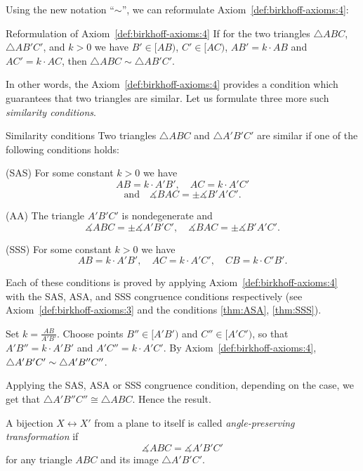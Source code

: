 Using the new notation ``$\sim$'', we can reformulate Axiom~\ref{def:birkhoff-axioms:4}:

\begin{thm}{Reformulation of Axiom~\ref{def:birkhoff-axioms:4}}
If for the two triangles 
$\triangle ABC$, 
$\triangle AB'C'$,
and $k>0$ we have
$B'\in [AB)$,
$C'\in [AC)$,
$AB'=k\cdot AB$ and
$AC'=k\cdot AC$,
then $\triangle ABC\sim\triangle AB'C'$.
\end{thm}

In other words, the Axiom~\ref{def:birkhoff-axioms:4} provides 
a condition which guarantees that two triangles are similar.
Let us formulate three more such {}\emph{similarity conditions}.

\begin{thm}{Similarity conditions}\label{prop:sim}
Two triangles 
$\triangle ABC$ and $\triangle A'B'C'$
are similar if one of the following conditions holds:

(SAS) For some constant $k>0$ we have
$$A B=k\cdot A' B',
\quad 
A C=k\cdot A' C'$$
$$
\text{and}
\quad 
\measuredangle B A C=\pm\measuredangle B' A' C'.$$

(AA) The triangle $A' B' C'$ is nondegenerate
and 
$$\measuredangle A B C
=
\pm\measuredangle A' B' C',
\quad 
\measuredangle B A C
=
\pm\measuredangle B' A' C'.$$

(SSS) For some constant $k>0$ we have
$$A B=k\cdot A' B',
\quad
A C=k\cdot A' C',
\quad
CB=k\cdot C'B'.$$

\end{thm}

Each of these conditions is proved by applying Axiom~\ref{def:birkhoff-axioms:4} with the SAS, ASA, and SSS congruence conditions respectively
(see Axiom~\ref{def:birkhoff-axioms:3} and the conditions \ref{thm:ASA}, \ref{thm:SSS}).


Set $k=\tfrac{AB}{A'B'}$.
Choose points $B''\in [A'B')$ and $C''\in [A'C')$,
so that $A'B''=k\cdot A'B'$ and $A'C''=k\cdot A'C'$.
By Axiom~\ref{def:birkhoff-axioms:4},
$\triangle A'B'C'\z\sim \triangle A'B''C''$.

Applying the SAS, ASA or SSS congruence condition, depending on the case, 
we get that $\triangle A'B''C''\cong \triangle ABC$.
Hence the result.
\qeds



A bijection $X\leftrightarrow X'$ from a plane to itself is called \emph{angle-preserving transformation} if 
\[\measuredangle ABC= \measuredangle A'B'C'\]
for any triangle $ABC$ and its image $\triangle A'B'C'$.

